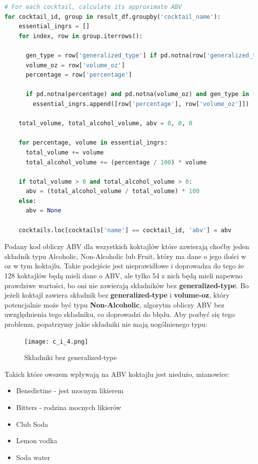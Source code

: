 \documentclass{article}
\begin{document}
\begin{lstlisting}[language=Python]
# For each cocktail, calculate its approximate ABV
for cocktail_id, group in result_df.groupby('cocktail_name'):
    essential_ingrs = []
    for index, row in group.iterrows():

      gen_type = row['generalized_type'] if pd.notna(row['generalized_type']) else "Unknown"
      volume_oz = row['volume_oz']
      percentage = row['percentage']

      if pd.notna(percentage) and pd.notna(volume_oz) and gen_type in ('Alcoholic', 'Non-Alcoholic', 'Fruit'):
        essential_ingrs.append([row['percentage'], row['volume_oz']])

    total_volume, total_alcohol_volume, abv = 0, 0, 0

    for percentage, volume in essential_ingrs:
      total_volume += volume
      total_alcohol_volume += (percentage / 100) * volume

    if total_volume > 0 and total_alcohol_volume > 0:
      abv = (total_alcohol_volume / total_volume) * 100
    else:
      abv = None

    cocktails.loc[cocktails['name'] == cocktail_id, 'abv'] = abv
\end{lstlisting}

Podany kod obliczy ABV dla wszystkich koktajlów które zawierają choćby jeden składnik typu Alcoholic, Non-Alcoholic lub Fruit, który ma dane o jego ilości w oz w tym koktajlu. Takie podejście jest nieprawidłowe i doprowadza do tego że 128 koktajlów będą mieli dane o ABV, ale tylko 54 z nich będą mieli napewno prawdziwe wartości, bo oni nie zawierają składników bez \textbf{generalized-type}. Bo jeżeli koktajl zawiera składnik bez \textbf{generalized-type} i \textbf{volume-oz}, który potencjalnie może być typu \textbf{Non-Alcoholic}, algorytm obliczy ABV bez uwzględnienia tego składniku, co doprowadzi do błędu.
\clearpage
Aby pozbyć się tego problemu, popatrzymy jakie składniki nie mają uogólnienego typu:


\begin{figure}[htbp]
\centering
    \texttt{[image: c\_i\_4.png]}
    \caption{Składniki bez generalized-type}
\end{figure}

Takich które owszem wpływają na ABV koktajlu jest niedużo, mianowice:
\begin{itemize}
    \item Benedictine - jest mocnym likierem
    \item Bitters - rodzina mocnych likierów
    \item Club Soda
    \item Lemon vodka
    \item Soda water
\end{itemize}
\end{document}
